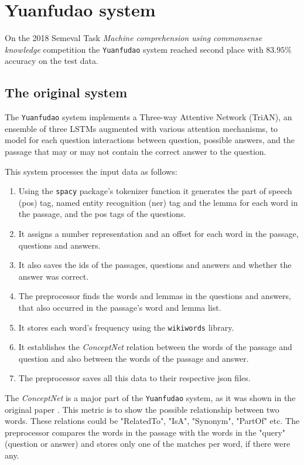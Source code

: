 \chapter{Yuanfudao system}
\label{chap:yuanfudao}
On the 2018 Semeval Task \textit{Machine comprehension using commonsense knowledge} competition the \texttt{Yuanfudao} \cite{Wang:2018} system reached second place with $83.95\%$ accuracy on the test data.

\section{The original system}

The \texttt{Yuanfudao} system implements a Three-way Attentive Network (TriAN), an ensemble of three LSTMs augmented with various attention mechanisms, to model for each question interactions between question, possible answers, and the passage that may or may not contain the correct answer to the question.


This system processes the input data as follows:

\begin{enumerate}
	\item Using the \texttt{spacy} package's tokenizer function it generates the part of speech (pos) tag, named entity recognition (ner) tag and the lemma for each word in the passage, and the pos tags of the questions.
	\item It assigns a number representation and an offset for each word in the passage, questions and answers.
	\item It also saves the ids of the passages, questions and answers and whether the answer was correct.
	\item The preprocessor finds the words and lemmas in the questions and answers, that also occurred in the passage's word and lemma list. 
	\item It stores each word's frequency using the \texttt{wikiwords} library.
	\item It  establishes the \textit{ConceptNet} relation between the words of the passage and question and also between the words of the passage and answer.
	\item The preprocessor saves all this data to their respective json files.
\end{enumerate}


The \textit{ConceptNet} is a major part of the \texttt{Yuanfudao} system, as it was shown in the original paper \cite{Wang:2018}. This metric is to show the possible relationship between two words. These relations could be "RelatedTo", "IsA", "Synonym", "PartOf" etc. The preprocessor compares the words in the passage with the words in the "query" (question or answer) and stores only one of the matches per word, if there were any.

